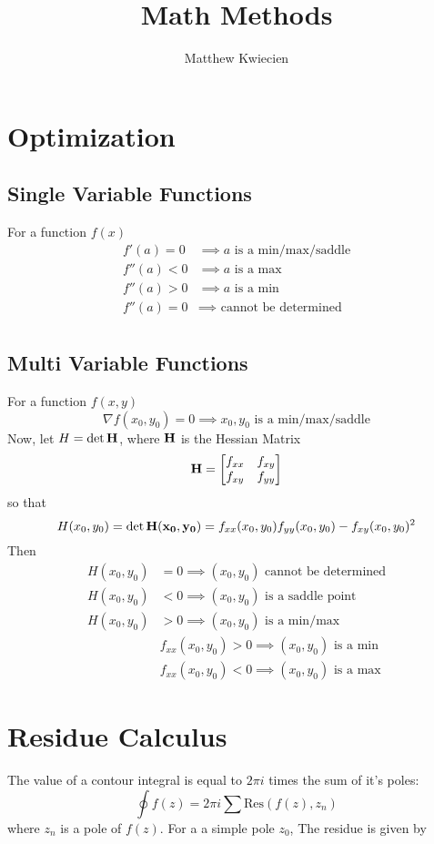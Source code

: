 \documentclass{article}
\title{Math Methods}
\author{Matthew Kwiecien}
\begin{document}
\maketitle
\section{Optimization}
\subsection{Single Variable Functions}
For a function $f(x)$
\begin{align*}
	f'(a) = 0  & \implies  a \text{ is a min/max/saddle} \\
	f''(a) < 0 & \implies a \text{ is a max}             \\
	f''(a) > 0 & \implies  a \text{ is a min}            \\
	f''(a) = 0 & \implies  \text{ cannot be determined}  \\
\end{align*}
\subsection{Multi Variable Functions}
For a function $f(x,y)$
$$
\nabla f(x_0, y_0) = 0 \implies x_0, y_0 \text{ is a min/max/saddle}
$$
Now, let $H = \det \vb{H}$, where $\vb{H}$ is the Hessian Matrix
$$
\vb{H} = 
\begin{bmatrix}
	f_{xx} & f_{xy} \\
	f_{xy} & f_{yy} 
\end{bmatrix}
$$
so that
$$
H(x_0, y_0) = \det \vb{H(x_0, y_0)} = f_{xx}(x_0, y_0)f_{yy}(x_0, y_0) - f_{xy}(x_0, y_0)^2
$$
Then
\begin{align*}
	H(x_0, y_0) & = 0 \implies  (x_0, y_0) \text{ cannot be determined}      \\
	H(x_0, y_0) & < 0 \implies (x_0, y_0) \text{ is a saddle point}          \\
	H(x_0, y_0) & > 0 \implies  (x_0, y_0) \text{ is a min/max}              \\
	            & f_{xx}(x_0, y_0) > 0  \implies (x_0, y_0) \text{ is a min} \\
	            & f_{xx}(x_0, y_0) < 0  \implies (x_0, y_0) \text{ is a max} 
\end{align*}

\section{Residue Calculus}
The value of a contour integral is equal to $2\pi i$ times the sum of it's poles:
$$
\oint f(z) = 2\pi i\sum \text{Res}(f(z), z_n)
$$
where $z_n$ is a pole of $f(z)$. For a a simple pole $z_0$, The residue is given by 
\end{document}
